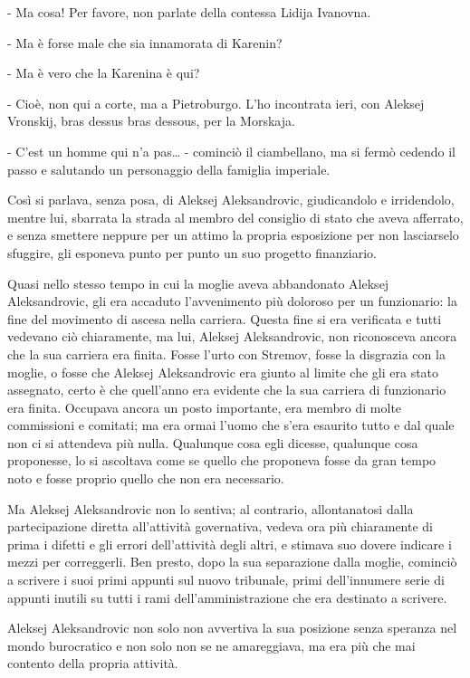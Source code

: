 - Ma cosa! Per favore, non parlate della contessa Lidija Ivanovna. 

- Ma è forse male che sia innamorata di Karenin? 

- Ma è vero che la Karenina è qui? 

- Cioè, non qui a corte, ma a Pietroburgo. L'ho incontrata ieri, con Aleksej Vronskij, bras dessus bras dessous, per la Morskaja. 

- C'est un homme qui n'a pas\ldots{} - cominciò il ciambellano, ma si fermò cedendo il passo e salutando un personaggio della famiglia imperiale. 

Così si parlava, senza posa, di Aleksej Aleksandrovic, giudicandolo e irridendolo, mentre lui, sbarrata la strada al membro del consiglio di stato che aveva afferrato, e senza smettere neppure per un attimo la propria esposizione per non lasciarselo sfuggire, gli esponeva punto per punto un suo progetto finanziario. 

Quasi nello stesso tempo in cui la moglie aveva abbandonato Aleksej Aleksandrovic, gli era accaduto l'avvenimento più doloroso per un funzionario: la fine del movimento di ascesa nella carriera. Questa fine si era verificata e tutti vedevano ciò chiaramente, ma lui, Aleksej Aleksandrovic, non riconosceva ancora che la sua carriera era finita. Fosse l'urto con Stremov, fosse la disgrazia con la moglie, o fosse che Aleksej Aleksandrovic era giunto al limite che gli era stato assegnato, certo è che quell'anno era evidente che la sua carriera di funzionario era finita. Occupava ancora un posto importante, era membro di molte commissioni e comitati; ma era ormai l'uomo che s'era esaurito tutto e dal quale non ci si attendeva più nulla. Qualunque cosa egli dicesse, qualunque cosa proponesse, lo si ascoltava come se quello che proponeva fosse da gran tempo noto e fosse proprio quello che non era necessario. 

Ma Aleksej Aleksandrovic non lo sentiva; al contrario, allontanatosi dalla partecipazione diretta all'attività governativa, vedeva ora più chiaramente di prima i difetti e gli errori dell'attività degli altri, e stimava suo dovere indicare i mezzi per correggerli. Ben presto, dopo la sua separazione dalla moglie, cominciò a scrivere i suoi primi appunti sul nuovo tribunale, primi dell'innumere serie di appunti inutili su tutti i rami dell'amministrazione che era destinato a scrivere. 

Aleksej Aleksandrovic non solo non avvertiva la sua posizione senza speranza nel mondo burocratico e non solo non se ne amareggiava, ma era più che mai contento della propria attività. 

